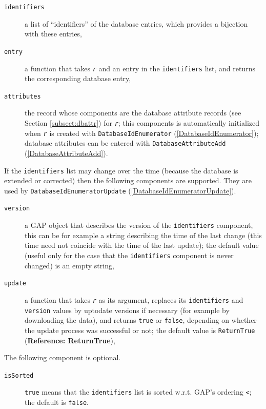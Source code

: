 \documentclass[a4paper,11pt]{report}
\begin{document}
{{{ 
\begin{description}
\item[{\texttt{identifiers}}]  a list of ``identifiers'' of the database entries, which provides a bijection with these entries, 
\item[{\texttt{entry}}]  a function that takes \mbox{\texttt{\mdseries\slshape r}} and an entry in the \texttt{identifiers} list, and returns the corresponding database entry, 
\item[{\texttt{attributes}}]  the record whose components are the database attribute records (see Section \ref{subsect:dbattr}) for \mbox{\texttt{\mdseries\slshape r}}; this components is automatically initialized when \mbox{\texttt{\mdseries\slshape r}} is created with \texttt{DatabaseIdEnumerator} (\ref{DatabaseIdEnumerator}); database attributes can be entered with \texttt{DatabaseAttributeAdd} (\ref{DatabaseAttributeAdd}). 
\end{description}
 

 If the \texttt{identifiers} list may change over the time (because the database is extended or corrected)
then the following components are supported. They are used by \texttt{DatabaseIdEnumeratorUpdate} (\ref{DatabaseIdEnumeratorUpdate}). 

 
\begin{description}
\item[{\texttt{version}}]  a \textsf{GAP} object that describes the version of the \texttt{identifiers} component, this can be for example a string describing the time of the last
change (this time need not coincide with the time of the last update); the
default value (useful only for the case that the \texttt{identifiers} component is never changed) is an empty string, 
\item[{\texttt{update}}]  a function that takes \mbox{\texttt{\mdseries\slshape r}} as its argument, replaces its \texttt{identifiers} and \texttt{version} values by up\texttt{}to\texttt{}date versions if
necessary (for example by downloading the data), and returns \texttt{true} or \texttt{false}, depending on whether the update process was successful or not; the default
value is \texttt{ReturnTrue} (\textbf{Reference: ReturnTrue}), 
\end{description}
 

 The following component is optional. 

 
\begin{description}
\item[{\texttt{isSorted}}]  \texttt{true} means that the \texttt{identifiers} list is sorted w.r.t. \textsf{GAP}'s ordering \texttt{\texttt{}{\textless}}; the default is \texttt{false}. 
\end{description}
 

}}}
\end{document}
